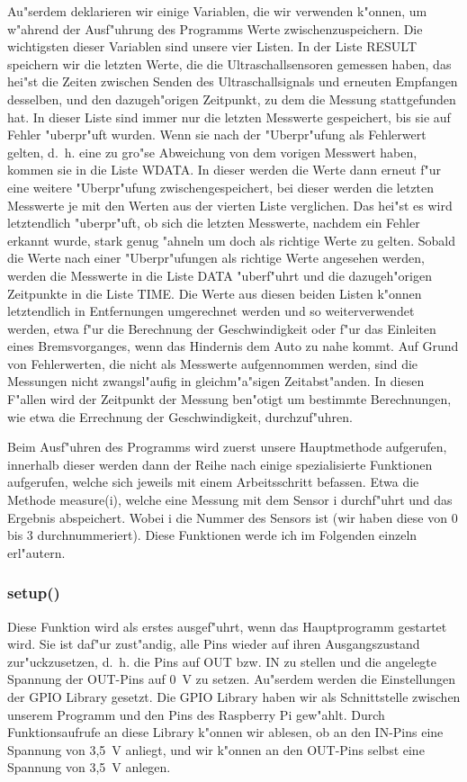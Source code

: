 \documentclass[a4paper,12pt]{article}
\begin{document}
Au"serdem deklarieren wir einige Variablen, die wir verwenden k"onnen, um w"ahrend der Ausf"uhrung des Programms Werte zwischenzuspeichern.
Die wichtigsten dieser Variablen sind unsere vier Listen.
In der Liste RESULT speichern wir die letzten Werte, die die Ultraschallsensoren gemessen haben, das hei"st die Zeiten zwischen Senden des Ultraschallsignals und erneuten Empfangen desselben, und den dazugeh"origen Zeitpunkt, zu dem die Messung stattgefunden hat.
In dieser Liste sind immer nur die letzten Messwerte gespeichert, bis sie auf Fehler "uberpr"uft wurden.
Wenn sie nach der "Uberpr"ufung als Fehlerwert gelten, d.~h. eine zu gro"se Abweichung von dem vorigen Messwert haben, kommen sie in die Liste WDATA.
In dieser werden die Werte dann erneut f"ur eine weitere "Uberpr"ufung zwischengespeichert, bei dieser werden die letzten Messwerte je mit den Werten aus der vierten Liste verglichen.
Das hei"st es wird letztendlich "uberpr"uft, ob sich die letzten Messwerte, nachdem ein Fehler erkannt wurde, stark genug "ahneln um doch als richtige Werte zu gelten.
Sobald die Werte nach einer "Uberpr"ufungen als richtige Werte angesehen werden, werden die Messwerte in die Liste DATA "uberf"uhrt und die dazugeh"origen Zeitpunkte in die Liste TIME.
Die Werte aus diesen beiden Listen k"onnen letztendlich in Entfernungen umgerechnet werden und so weiterverwendet werden, etwa f"ur die Berechnung der Geschwindigkeit oder f"ur das Einleiten eines Bremsvorganges, wenn das Hindernis dem Auto zu nahe kommt.
Auf Grund von Fehlerwerten, die nicht als Messwerte aufgennommen werden, sind die Messungen nicht zwangsl"aufig in gleichm"a"sigen Zeitabst"anden.
In diesen F"allen wird der Zeitpunkt der Messung ben"otigt um bestimmte Berechnungen, wie etwa die Errechnung der Geschwindigkeit, durchzuf"uhren.

\medskip

Beim Ausf"uhren des Programms wird zuerst unsere Hauptmethode aufgerufen, innerhalb dieser werden dann der Reihe nach einige spezialisierte Funktionen aufgerufen, welche sich jeweils mit einem Arbeitsschritt befassen.
Etwa die Methode measure(i), welche eine Messung mit dem Sensor i durchf"uhrt und das Ergebnis abspeichert.
Wobei i die Nummer des Sensors ist (wir haben diese von 0 bis 3 durchnummeriert).
Diese Funktionen werde ich im Folgenden einzeln erl"autern.

\subsubsection{setup()}\label{sec2.2.1}

Diese Funktion wird als erstes ausgef"uhrt, wenn das Hauptprogramm gestartet wird.
Sie ist daf"ur zust"andig, alle Pins wieder auf ihren Ausgangszustand zur"uckzusetzen, d.~h. die Pins auf OUT bzw. IN zu stellen und die angelegte Spannung der OUT-Pins auf 0~V zu setzen.
Au"serdem werden die Einstellungen der GPIO Library gesetzt.
Die GPIO Library haben wir als Schnittstelle zwischen unserem Programm und den Pins des Raspberry Pi gew"ahlt.
Durch Funktionsaufrufe an diese Library k"onnen wir ablesen, ob an den IN-Pins eine Spannung von 3,5~V anliegt, und wir k"onnen an den OUT-Pins selbst eine Spannung von 3,5~V anlegen.
\end{document}
